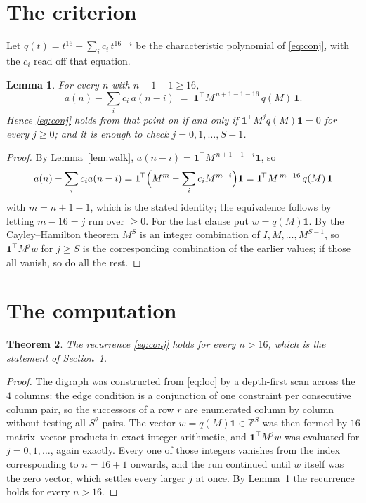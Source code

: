 \documentclass[11pt,a4paper]{article}
\theoremstyle{plain}
\newtheorem{theorem}{Theorem}
\newtheorem{lemma}[theorem]{Lemma}
\theoremstyle{definition}
\begin{document}
\section{The criterion}

Let $q(t)=t^{16}-\sum_i c_i\,t^{16-i}$ be the characteristic polynomial of
\eqref{eq:conj}, with the $c_i$ read off that equation.

\begin{lemma}\label{lem:crit}
For every $n$ with $n+1-1\ge16$,
\[
a(n)-\sum_i c_i\,a(n-i)\;=\;\mathbf{1}^{\!\top}M^{\,n+1-1-16}\,q(M)\,\mathbf{1} .
\]
Hence \eqref{eq:conj} holds from that point on if and only if
$\mathbf{1}^{\!\top}M^{j}q(M)\mathbf{1}=0$ for every $j\ge0$; and it is enough to check
$j=0,1,\dots,S-1$.
\end{lemma}

\begin{proof}
By Lemma~\ref{lem:walk}, $a(n-i)=\mathbf{1}^{\!\top}M^{\,n+1-1-i}\mathbf{1}$, so
\[
a(n)-\sum_i c_i a(n-i)
=\mathbf{1}^{\!\top}\Bigl(M^{m}-\sum_i c_i M^{m-i}\Bigr)\mathbf{1}
=\mathbf{1}^{\!\top}M^{\,m-16}\,q(M)\,\mathbf{1}
\]
with $m=n+1-1$, which is the stated identity; the equivalence follows by letting
$m-16=j$ run over $\ge0$. For the last clause put $w=q(M)\mathbf{1}$. By the
Cayley--Hamilton theorem $M^{S}$ is an integer combination of $I,M,\dots,M^{S-1}$, so
$\mathbf{1}^{\!\top}M^{j}w$ for $j\ge S$ is the corresponding combination of the earlier
values; if those all vanish, so do all the rest.
\end{proof}

\section{The computation}

\begin{theorem}
The recurrence \eqref{eq:conj} holds for every $n>16$, which is the statement of
Section~1.
\end{theorem}

\begin{proof}
The digraph was constructed from \eqref{eq:loc} by a depth-first scan across the $4$
columns: the edge condition is a conjunction of one constraint per consecutive column
pair, so the successors of a row $r$ are enumerated column by column without testing all
$S^2$ pairs. The vector $w=q(M)\mathbf{1}\in\mathbb{Z}^{S}$ was then formed by $16$
matrix--vector products in exact integer arithmetic, and $\mathbf{1}^{\!\top}M^{j}w$ was
evaluated for $j=0,1,\dots$, again exactly. Every one of those integers vanishes from the
index corresponding to $n=16+1$ onwards, and the run continued until $w$ itself was the
zero vector, which settles every larger $j$ at once. By Lemma~\ref{lem:crit} the recurrence
holds for every $n>16$.
\end{proof}
\end{document}
